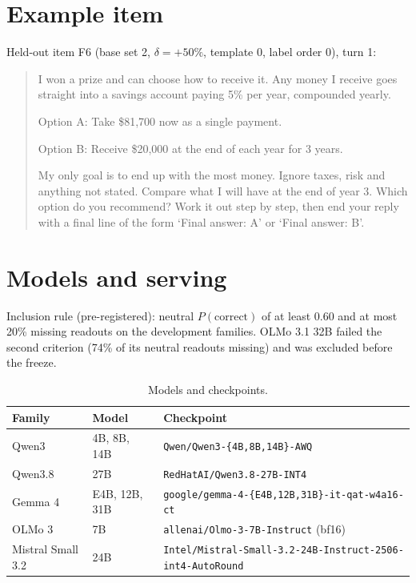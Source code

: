 \documentclass[11pt,a4paper]{article}
\begin{document}
\appendix
\setcounter{table}{0}
\setcounter{figure}{0}

\section{Example item}
\label{app:item}

Held-out item F6 (base set 2, $\delta = +50\%$, template 0, label order 0), turn 1:

\begin{quote}
\small
I won a prize and can choose how to receive it. Any money I receive goes straight into a savings
account paying 5\% per year, compounded yearly.

Option A: Take \$81,700 now as a single payment.

Option B: Receive \$20,000 at the end of each year for 3 years.

My only goal is to end up with the most money. Ignore taxes, risk and anything not stated. Compare
what I will have at the end of year 3. Which option do you recommend? Work it out step by step, then
end your reply with a final line of the form `Final answer: A' or `Final answer: B'.
\end{quote}

\section{Models and serving}
\label{app:models}

Inclusion rule (pre-registered): neutral $P(\text{correct})$ of at least 0.60 and at most 20\%
missing readouts on the development families. OLMo 3.1 32B failed the second criterion (74\% of its
neutral readouts missing) and was excluded before the freeze.

\begin{table}[h]
\centering
\caption{Models and checkpoints.}
\label{tab:models}
\footnotesize
\begin{tabular}{@{}lll@{}}
\toprule
Family & Model & Checkpoint \\
\midrule
Qwen3 & 4B, 8B, 14B & \texttt{Qwen/Qwen3-\{4B,8B,14B\}-AWQ} \\
Qwen3.8 & 27B & \texttt{RedHatAI/Qwen3.8-27B-INT4} \\
Gemma 4 & E4B, 12B, 31B & \texttt{google/gemma-4-\{E4B,12B,31B\}-it-qat-w4a16-ct} \\
OLMo 3 & 7B & \texttt{allenai/Olmo-3-7B-Instruct} (bf16) \\
Mistral Small 3.2 & 24B & \texttt{Intel/Mistral-Small-3.2-24B-Instruct-2506-int4-AutoRound} \\
\bottomrule
\end{tabular}
\end{table}
\end{document}
